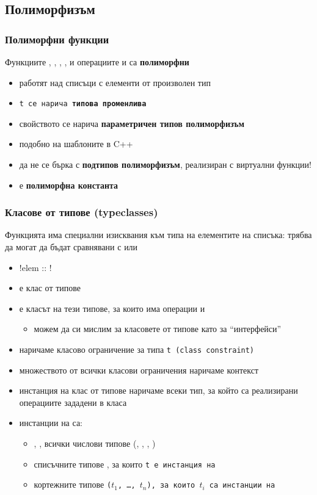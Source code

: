 \documentclass{beamer}
\begin{document}
\subsection{Полиморфизъм}

\begin{frame}
  \frametitle{Полиморфни функции}

  Функциите , , , ,  и операциите \lst{++} и \lst{!!} са \textbf{полиморфни}
  \begin{itemize}[<+->]
  \item работят над списъци с елементи от произволен тип \lst{[t]}
  \item \tt t се нарича \textbf{типова променлива}
  \item свойството се нарича \textbf{параметричен типов полиморфизъм}
  \item подобно на шаблоните в C++
  \item \alert{да не се бърка с \textbf{подтипов полиморфизъм}, реализиран с виртуални функции!}
  \item \lst{[]} е \textbf{полиморфна константа}
  \end{itemize}
\end{frame}

\begin{frame}[fragile]
  \frametitle{Класове от типове (typeclasses)}

  Функцията  има специални изисквания към типа на елементите на списъка: трябва да могат да бъдат сравнявани с \lst{==} или \lst{/=}
  \begin{itemize}[<+->]
  \item \lst!elem :: !
  \item {} е \alert{клас от типове}
  \item {} е класът на тези типове, за които има операции \lst{==} и \lst{/=}
    \begin{itemize}
    \item можем да си мислим за класовете от типове като за ``интерфейси''
    \end{itemize}
  \item {} наричаме \alert{класово ограничение} за типа \tt t (class constraint)
  \item множеството от всички класови ограничения наричаме \alert{контекст}
  \item \alert{инстанция} на клас от типове наричаме всеки тип, за който са реализирани операциите зададени в класа
  \item инстанции на  са:
    \begin{itemize}
    \item {}, , всички числови типове (, , , )
    \item списъчните типове \lst{[t]}, за които \tt t е инстанция на 
    \item кортежните типове \tt($t_1$\tt, \ldots\tt, $t_n$\tt), за които $t_i$ са инстанции на 
    \end{itemize}
  \end{itemize}
\end{frame}
\end{document}
